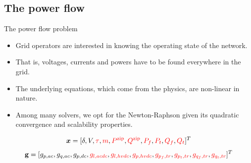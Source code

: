 



\subsection{The power flow}
\begin{frame}{The power flow problem}
    \begin{itemize}
        \item Grid operators are interested in knowing the operating state of the network.
        \item That is, voltages, currents and powers have to be found everywhere in the grid.
        \item The underlying equations, which come from the physics, are non-linear in nature.
        \item Among many solvers, we opt for the Newton-Raphson given its quadratic convergence and scalability properties.
    \end{itemize}

    \begin{equation}
    \bm{x} = [\delta, V, \textcolor{red}{\tau}, \textcolor{red}{m}, \textcolor{red}{P^\text{zip}}, \textcolor{red}{Q^\text{zip}}, \textcolor{red}{P_f}, \textcolor{red}{P_t}, \textcolor{red}{Q_f}, \textcolor{red}{Q_t}]^T
    \end{equation}
    \begin{equation}
    \mathbf{g} =
    [g_{p,ac}, g_{q,ac}, g_{p,dc}, \textcolor{red}{g_{l,acdc}}, \textcolor{red}{g_{l,hvdc}}, \textcolor{red}{g_{p,hvdc}}, \textcolor{red}{g_{p_f,tr}}, \textcolor{red}{g_{p_t,tr}}, \textcolor{red}{g_{q_f,tr}}, \textcolor{red}{g_{q_t,tr}}]^T
    \end{equation}
\end{frame}


